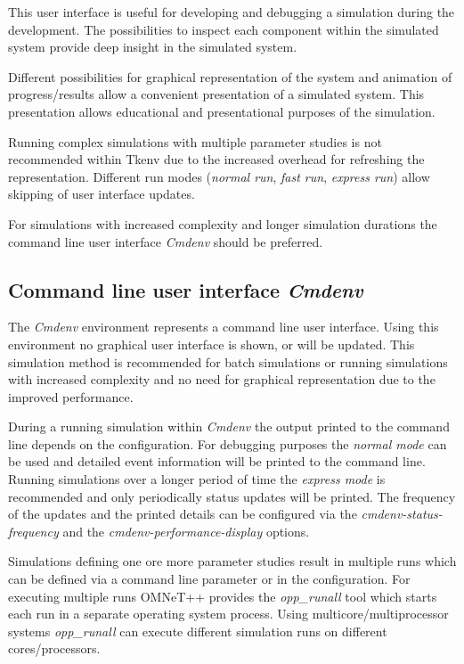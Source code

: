 This user interface is useful for developing and debugging a simulation during the development.
The possibilities to inspect each component within the simulated system provide deep insight in the simulated system.

Different possibilities for graphical representation of the system and animation of progress/results allow a convenient presentation of a simulated system.
This presentation allows educational and presentational purposes of the simulation. \cite[section 7.1]{omnet_user_guide}

Running complex simulations with multiple parameter studies is not recommended within Tkenv due to the increased overhead for refreshing the representation.
Different run modes (\emph{normal run}, \emph{fast run}, \emph{express run}) allow skipping of user interface updates. \cite[section 7.3.2]{omnet_user_guide}

For simulations with increased complexity and longer simulation durations the command line user interface \emph{Cmdenv} should be preferred.

\subsection{Command line user interface \emph{Cmdenv}}
\label{sec:omnet_running_cmdenv}
The \emph{Cmdenv} environment represents a command line user interface.
Using this environment no graphical user interface is shown, or will be updated.
This simulation method is recommended for batch simulations or running simulations with increased complexity and no need for graphical representation due to the improved performance.

During a running simulation within \emph{Cmdenv} the output printed to the command line depends on the configuration.
For debugging purposes the \emph{normal mode} can be used and detailed event information will be printed to the command line.
Running simulations over a longer period of time the \emph{express mode} is recommended and only periodically status updates will be printed.
The frequency of the updates and the printed details can be configured via the \emph{cmdenv-status-frequency} and the \emph{cmdenv-performance-display} options. \cite[section 10.2.3]{omnet_manual}

Simulations defining one ore more parameter studies result in multiple runs which can be defined via a command line parameter or in the configuration.
For executing multiple runs OMNeT++ provides the \emph{opp\_runall} tool which starts each run in a separate operating system process.
Using multicore/multiprocessor systems \emph{opp\_runall} can execute different simulation runs on different cores/processors. \cite[section 10.4.3]{omnet_manual}
\\

